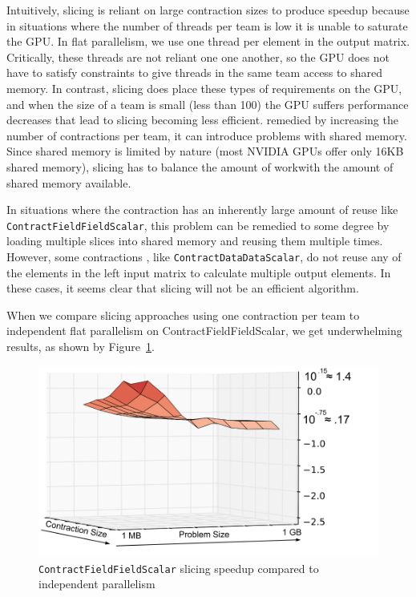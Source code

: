 Intuitively, slicing is reliant on large contraction
sizes to produce speedup because in situations where the number of threads per
team is low it is unable to saturate the GPU. In flat parallelism, we use one thread per
element in the output matrix. Critically, these threads are
not reliant one one another, so the GPU does not have to satisfy constraints to 
give threads in the same team access to shared memory. In contrast, slicing does 
place these types of requirements on the GPU, and when the size of a team is small (less than 100)
the GPU suffers performance decreases that lead to slicing becoming less efficient. 
remedied by increasing the number of contractions per team, it can introduce
problems with shared memory. Since shared memory is limited by nature (most NVIDIA GPUs offer only 16KB shared memory), slicing has to balance the amount of workwith the amount of shared memory
available.
	
    In situations where the contraction has an inherently large amount of reuse
like \texttt{ContractFieldFieldScalar}, this problem can be remedied to some degree by loading multiple slices into shared memory and reusing them multiple times. However, some 
contractions , like \texttt{ContractDataDataScalar}, do not reuse any of the elements in the left input matrix to
calculate multiple output elements. In these cases, it seems
clear that slicing will not be an efficient algorithm. 
	
When we compare slicing approaches using one contraction per team to
independent flat parallelism on ContractFieldFieldScalar, we get underwhelming
results, as shown by Figure~\ref{fig:CFFSSlicingVSIndepentent}. 

\begin{figure}[!ht] 
    \centering
    \includegraphics[scale = .4]{CFFS_Slicing}
    \caption[\texttt{ContractFieldFieldScalar} speedup over
    flat parallel]{\texttt{ContractFieldFieldScalar} slicing speedup compared to
    independent parallelism}
\label{fig:CFFSSlicingVSIndepentent}
\end{figure}


